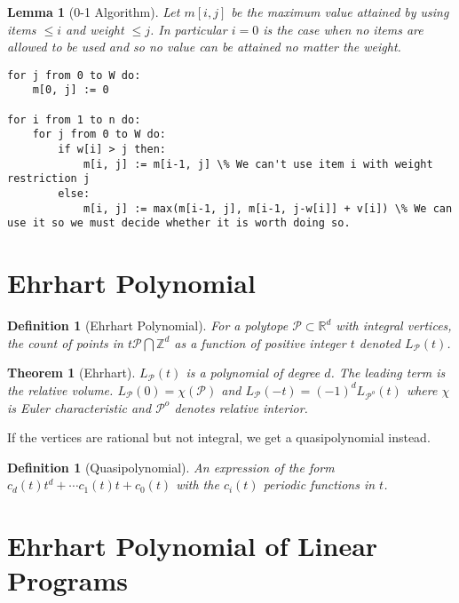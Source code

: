 \documentclass[11pt]{article}
\theoremstyle{change}
\newtheorem{definition}[equation]{Definition}
\newtheorem{theorem}[equation]{Theorem}
\newtheorem{lemma}[equation]{Lemma}
\theoremstyle{nonumberplain}
\numberwithin{equation}{section}
\begin{document}
\begin{lemma}[0-1 Algorithm]

Let $m[i,j]$ be the maximum value attained by using items $\leq i$ and weight $\leq j$. In particular $i=0$ is the case when no items are allowed to be used and so no value can be attained no matter the weight.

\begin{lstlisting}[label=KnapsackDynamicProgramming,caption=KnapsackDynamicProgramming]
for j from 0 to W do:
    m[0, j] := 0

for i from 1 to n do:
    for j from 0 to W do:
        if w[i] > j then:
            m[i, j] := m[i-1, j] \% We can't use item i with weight restriction j
        else:
            m[i, j] := max(m[i-1, j], m[i-1, j-w[i]] + v[i]) \% We can use it so we must decide whether it is worth doing so.
\end{lstlisting}
\end{lemma}

\section{Ehrhart Polynomial}

\begin{definition}[Ehrhart Polynomial]
For a polytope $\mathcal{P} \subset \mathbb{R}^d$ with integral vertices, the count of points in $t\mathcal{P} \bigcap \mathbb{Z}^d$ as a function of positive integer $t$ denoted $L_\mathcal{P} (t)$.
\end{definition}

\begin{theorem}[Ehrhart]
$L_{\mathcal{P}} (t)$ is a polynomial of degree $d$. The leading term is the relative volume. $L_\mathcal{P} (0) = \chi (\mathcal{P})$ and $L_{\mathcal{P}} (-t) = (-1)^d L_{\mathcal{P}^o} (t)$ where $\chi$ is Euler characteristic and $\mathcal{P}^o$ denotes relative interior.
\end{theorem}

If the vertices are rational but not integral, we get a quasipolynomial instead.

\begin{definition}[Quasipolynomial]
An expression of the form $c_d (t) t^d + \cdots c_1 (t) t + c_0 (t)$ with the $c_i (t)$ periodic functions in $t$.
\end{definition}

\section{Ehrhart Polynomial of Linear Programs}
\end{document}
